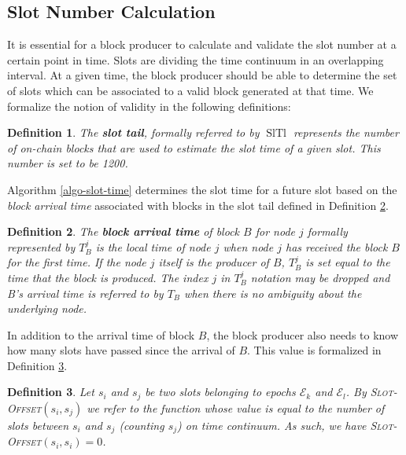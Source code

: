 \documentclass{book}
\newcommand{\tmem}[1]{{\em #1\/}}
\newcommand{\tmname}[1]{\textsc{#1}}
\newcommand{\tmop}[1]{\ensuremath{\operatorname{#1}}}
\newcommand{\tmstrong}[1]{\textbf{#1}}
\newcommand{\tmtextbf}[1]{{\bfseries{#1}}}
\newcommand{\tmtextit}[1]{{\itshape{#1}}}
\newcommand{\tmtextsc}[1]{{\scshape{#1}}}
\newcommand{\tmtexttt}[1]{{\ttfamily{#1}}}
\newcommand{\tmverbatim}[1]{{\ttfamily{#1}}}
\newtheorem{definition}{Definition}
\providecommand{\tmem}[1]{\tmtextit{#1}}
\providecommand{\tmname}[1]{\tmtextsc{#1}}
\providecommand{\tmop}[1]{\ensuremath{\mathrm{#1}}}
\providecommand{\tmstrong}[1]{\tmtextbf{#1}}
\providecommand{\tmtextbf}[1]{\tmtextbf{#1}}
\providecommand{\tmtextit}[1]{\tmtextit{#1}}
\providecommand{\tmverbatim}[1]{\tmtexttt{#1}}
\newtheorem{definition}{Definition}
\begin{document}
\subsection{Slot Number Calculation}

It is essential for a block producer to calculate and validate the slot number
at a certain point in time. Slots are dividing the time continuum in an
overlapping interval. At a given time, the block producer should be able to
determine the set of slots which can be associated to a valid block generated
at that time. We formalize the notion of validity in the following
definitions:

\begin{definition}
  \label{slot-time-cal-tail}The {\tmstrong{slot tail}}, formally referred to
  by $\tmop{SlTl}$ represents the number of on-chain blocks that are used to
  estimate the slot time of a given slot. This number is set to be 1200.
\end{definition}

Algorithm \ref{algo-slot-time} determines the slot time for a future slot
based on the {\tmem{block arrival time}} associated with blocks in the slot
tail defined in Definition \ref{defn-block-time}.

\begin{definition}
  \label{defn-block-time}The {\tmstrong{block arrival time}} of block $B$ for
  node $j$ formally represented by {\tmstrong{$T^j_B$}} is the local time
  of\tmverbatim{} node $j$ when node $j$ has received the block $B$ for the
  first time. If the node $j$ itself is the producer of $B$, $T_B^j$ is set
  equal to the time that the block is produced. The index $j$ in $T^j_B$
  notation may be dropped and B's arrival time is referred to by $T_B$ when
  there is no ambiguity about the underlying node.
\end{definition}

In addition to the arrival time of block $B$, the block producer also needs to
know how many slots have passed since the arrival of $B$. This value is
formalized in Definition \ref{defn-slot-offset}.

\begin{definition}
  \label{defn-slot-offset}Let $s_i$ and $s_j$ be two slots belonging to epochs
  $\mathcal{E}_k$ and $\mathcal{E}_l$. By {\tmname{Slot-Offset}}$(s_i, s_j)$
  we refer to the function whose value is equal to the number of slots between
  $s_i$ and $s_j$ (counting $s_j$) on time continuum. As such, we have
  {\tmname{Slot-Offset}}$(s_i, s_i) = 0$.
\end{definition}
\end{document}
